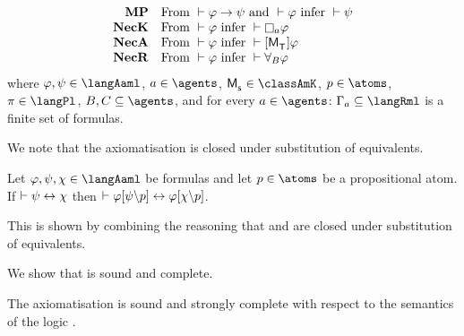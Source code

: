 \begin{definition}
$$\begin{array}{rl}
    {\bf MP}    & \text{From } \proves \phi \implies \psi \text{ and } \proves \phi \text{ infer } \proves \psi\\
    {\bf NecK}  & \text{From } \proves \phi \text{ infer } \proves \necessaryA \phi\\
    {\bf NecA} & \text{From } \proves \phi \text{ infer } \proves \actionA{\aPModel{\aStatesT}} \phi\\
    {\bf NecR} & \text{From } \proves \phi \text{ infer } \proves \allrefsBs \phi
\end{array}
$$
where $\phi, \psi \in \langAaml$, $\agentA \in \agents$, $\aPModel{\aStateS} \in \classAmK$, $\atomP \in \atoms$, $\pi \in \langPl$, $\agentsB, \agentsC \subseteq \agents$, and for every $\agentA \in \agents$: $\Gamma_\agentA \subseteq \langRml$ is a finite set of formulas.
\end{definition}

We note that the axiomatisation \axiomRamlK{} is closed under substitution of equivalents.

\begin{lemma}
Let $\phi, \psi, \chi \in \langAaml$ be formulas and let $\atomP \in \atoms$ be a propositional atom.
If $\vdash \psi \leftrightarrow \chi$ then $\vdash \varphi[\psi\backslash p] \leftrightarrow \varphi[\chi\backslash p]$.
\end{lemma}

This is shown by combining the reasoning that \axiomAmlK{} and \axiomRmlK{} are closed under substitution of equivalents.

We show that \axiomRamlK{} is sound and complete.

\begin{lemma}\label{raml-k-sound-complete}
The axiomatisation \axiomRamlK{} is sound and strongly complete with respect to the semantics of the logic \logicRamlK{}.
\end{lemma}


